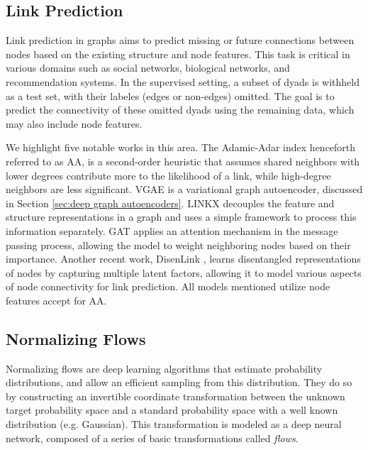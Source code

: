 \documentclass[letterpaper]{article} %
\begin{document}
\begingroup
\color{blue}
\subsection{Link Prediction}
\label{sec:link prediction theory}
Link prediction in graphs aims to predict missing or future connections between nodes based on the existing structure and node features. This task is critical in various domains such as social networks, biological networks, and recommendation systems. In the supervised setting, a subset of dyads is withheld as a test set, with their labeles (edges or non-edges) omitted. The goal is to predict the connectivity of these omitted dyads using the remaining data, which may also include node features.

We highlight five notable works in this area. The Adamic-Adar index \cite{adamic2003friends} henceforth referred to as AA, is a second-order heuristic that assumes shared neighbors with lower degrees contribute more to the likelihood of a link, while high-degree neighbors are less significant. VGAE \cite{kipf2016variational} is a variational graph autoencoder, discussed in Section \ref{sec:deep graph autoencoders}. LINKX \cite{lim2021linkx} decouples the feature and structure representations in a graph and uses a simple framework to process this information separately. GAT \cite{GAT} applies an attention mechanism in the message passing process, allowing the model to weight neighboring nodes based on their importance. Another recent work, DisenLink \cite{zhou2022disenlink}, learns disentangled representations of nodes by capturing multiple latent factors, allowing it to model various aspects of node connectivity for link prediction. All models mentioned utilize node features accept for AA.
\endgroup

\subsection{Normalizing Flows}
\label{extended_sec:normflows}

Normalizing flows are deep learning algorithms that estimate  probability distributions, and allow an efficient sampling from this distribution. They do so by constructing an invertible coordinate transformation between the unknown target probability space and a standard probability space with a well known distribution (e.g. Gaussian). This transformation is modeled as a deep neural network, composed of a series of basic transformations called \emph{flows}. 
\end{document}
